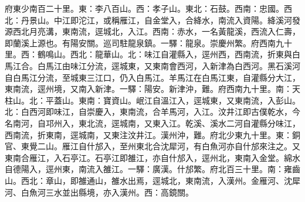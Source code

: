 \begin{pinyinscope}
府東少南百二十里。東：李八百山。西：孝子山。東北：石鼓。西南：忠國。西北：丹景山。中江即沱江，或稱雁江，自金堂入，合絳水，南流入資陽。絳溪河發源西北月亮溝，東南流，逕城北，入江。西南：赤水，一名黃龍溪，西流入仁壽，即蘭溪上源也。有陽安關。巡司駐龍泉鎮。一驛：龍泉。崇慶州繁。府西南九十里。西：鶴鳴山。西北：龍華山。北：味江自灌縣入，逕州西，西南流，折東與白馬江合。白馬江由味江分流，逕城東，又東南會西河，入新津為白西河。黑石溪河自白馬江分流，至城東三江口，仍入白馬江。羊馬江在白馬江東，自灌縣分大江，東南流，逕州境，又南入新津。一驛：陽安。新津沖，難。府西南九十里。南：天柱山。北：平蓋山。東南：寶資山。岷江自溫江入，逕城東，又東南流，入彭山。北：白西河即味江，自崇慶入，東南流，合羊馬河，入江。汶井江即古僕乾水，今名南河，自邛州入，東北流，逕城南，又東入江。乾溪、溪水二河自灌縣分味江，西南流，折東南，逕城南，又東注汶井江。漢州沖，難。府北少東九十里。東：銅官、東覺二山。雁江自什邡入，至州東北合沈犀河，有白魚河亦自什邡來注之。又東南合雁江，入石亭江。石亭江即雒江，亦自什邡入，逕州北，東南入金堂。綿水自德陽入，逕州東，南流入雒江。一驛：廣漢。什邡繁。府北百三十里。南：雍齒山。西北：章山，即雒通山，雒水出焉，逕城北，東南流，入漢州。金雁河、沈犀河、白魚河三水並出縣境，亦入漢州。西：高鏡關。


\end{pinyinscope}

